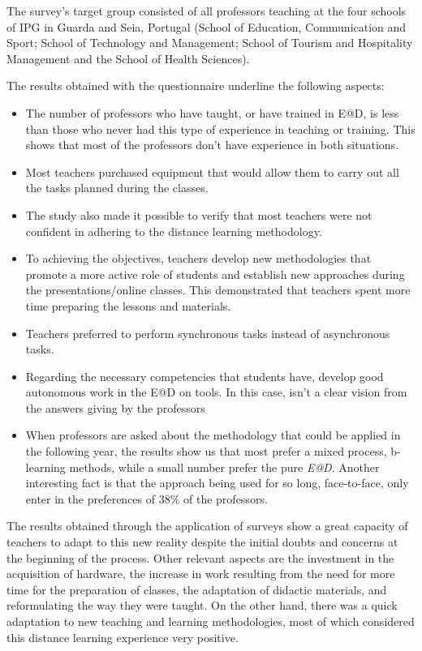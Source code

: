 \documentclass{textolivre}
\begin{document}
The survey's target group consisted of all professors teaching at the four schools of IPG in Guarda and Seia, Portugal (School of Education, Communication and Sport; School of Technology and Management; School of Tourism and Hospitality Management and the School of Health Sciences). 

The results obtained with the questionnaire underline the following aspects:

\begin{itemize}
    \item The number of professors who have taught, or have trained in E@D, is less than those who never had this type of experience in teaching or training. This shows that most of the professors don't have experience in both situations.
    \item Most teachers purchased equipment that would allow them to carry out all the tasks planned during the classes.
    \item The study also made it possible to verify that most teachers were not confident in adhering to the distance learning methodology.
    \item To achieving the objectives, teachers develop new methodologies that promote a more active role of students and establish new approaches during the presentations/online classes. This demonstrated that teachers spent more time preparing the lessons and materials.
    \item Teachers preferred to perform synchronous tasks instead of asynchronous tasks.
    \item Regarding the necessary competencies that students have, develop good autonomous work in the E@D on tools. In this case, isn't a clear vision from the answers giving by the professors
    \item When professors are asked about the methodology that could be applied in the following year, the results show us that most prefer a mixed process, b-learning methods, while a small number prefer the pure \emph{E@D}. Another interesting fact is that the approach being used for so long, face-to-face, only enter in the preferences of 38\% of the professors.
\end{itemize}

The results obtained through the application of surveys show a great capacity of teachers to adapt to this new reality despite the initial doubts and concerns at the beginning of the process. Other relevant aspects are the investment in the acquisition of hardware, the increase in work resulting from the need for more time for the preparation of classes, the adaptation of didactic materials, and reformulating the way they were taught. On the other hand, there was a quick adaptation to new teaching and learning methodologies, most of which considered this distance learning experience very positive.
\end{document}
